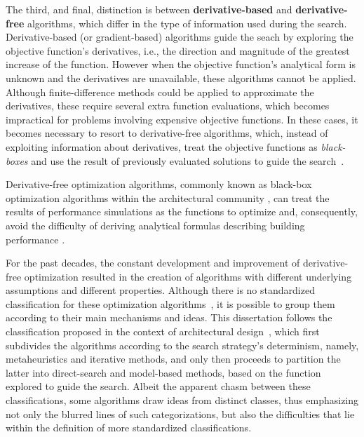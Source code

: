 	The third, and final, distinction is between \textbf{derivative-based} and \textbf{derivative-free} algorithms, which differ in the type of information used during the search. Derivative-based (or gradient-based) algorithms guide the seach by exploring the objective function's derivatives, i.e., the direction and magnitude of the greatest increase of the function. %
	However when the objective function's analytical form is unknown and the derivatives are unavailable, these algorithms cannot be applied. Although finite-difference methods could be applied to approximate the derivatives, these require several extra function evaluations, which becomes impractical for problems involving expensive objective functions. In these cases, it becomes necessary to resort to derivative-free algorithms, which, instead of exploiting information about derivatives, treat the objective functions as \textit{black-boxes} and use the result of previously evaluated solutions to guide the search~\cite{Rios2013}.
	
	Derivative-free optimization algorithms, commonly known as black-box optimization algorithms within the architectural community \cite{Wortmann2016BBO},
	can treat the results of performance simulations as the functions to optimize and, consequently, avoid the difficulty of deriving analytical formulas describing building performance \cite{Machairas2014}.
	
	For the past decades, the constant development and improvement of derivative-free optimization resulted in the creation of algorithms with different underlying assumptions and different properties. Although there is no standardized classification for these optimization algorithms~\cite{Rios2013, Wortmann2017ADO}, it is possible to group them according to their main mechanisms and ideas. This dissertation follows the classification proposed in the context of architectural design~\cite{Wortmann2015AdvSBO}, which first subdivides the algorithms according to the search strategy's determinism, namely, metaheuristics and iterative methods, and only then proceeds to partition the latter into direct-search and model-based methods, based on the function explored to guide the search. Albeit the apparent chasm between these classifications, some algorithms draw ideas from distinct classes, thus emphasizing not only the blurred lines of such categorizations, but also the difficulties that lie within the definition of more standardized classifications. 
	
